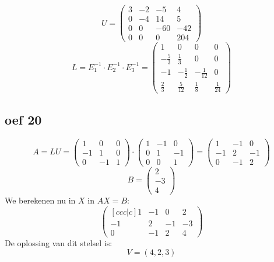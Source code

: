 \documentclass[10pt,a4paper]{article}
\begin{document}
\[ U = 
\begin{pmatrix}
3 & -2 & -5 & 4\\
0 & -4 & 14 & 5\\
0 & 0 & -60 & -42\\
0 & 0 & 0 & 204
\end{pmatrix}
\]
\[ L = E_1^{-1} \cdot E_2^{-1} \cdot E_3^{-1}
= \begin{pmatrix}
1 & 0 & 0 & 0\\
-\frac{5}{3} & \frac{1}{3} & 0 & 0\\
-1 & -\frac{1}{2} & -\frac{1}{12} & 0\\
\frac{2}{3} & \frac{5}{12} & \frac{1}{8} & \frac{1}{24}
\end{pmatrix}
\]


\subsection*{oef 20}
$$ A = LU = \begin{pmatrix}
1 & 0 & 0\\
-1 & 1 & 0\\
0 & -1 & 1
\end{pmatrix}
\cdot \begin{pmatrix}
1 & -1 & 0\\
0 & 1 & -1\\
0 & 0 & 1
\end{pmatrix}
=
\begin{pmatrix}
1 & -1 & 0\\
-1 & 2 & -1\\
0 & -1 & 2
\end{pmatrix}
$$
$$B = \begin{pmatrix}
2\\
-3\\
4
\end{pmatrix}
$$
We berekenen nu in $X$ in $AX = B$:
$$
\begin{pmatrix}[ccc|c]
1 & -1 & 0 & 2\\
-1 & 2 & -1 & -3\\
0 & -1 & 2 & 4
\end{pmatrix}
$$
De oplossing van dit stelsel is:\\
$$V = {(4,2,3)}$$
\end{document}
